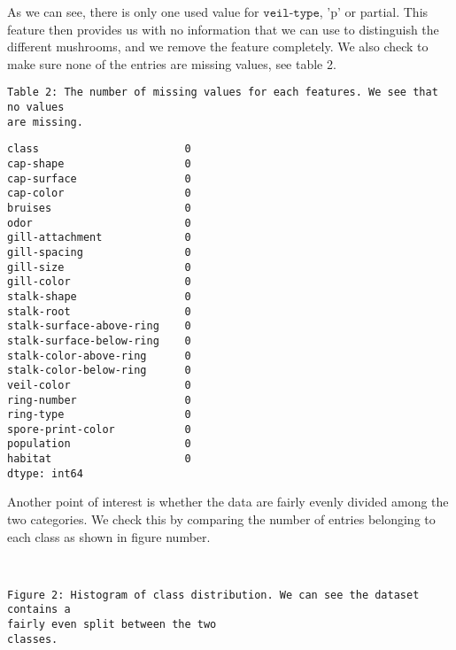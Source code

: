 \documentclass[11pt]{article}
\makeatletter
\newcommand{\boxspacing}{\kern\kvtcb@left@rule\kern\kvtcb@boxsep}
\newcommand{\prompt}[4]{
        {\ttfamily\llap{{\color{#2}[#3]:\hspace{3pt}#4}}\vspace{-\baselineskip}}
    }
\makeatother
\begin{document}
    As we can see, there is only one used value for $\texttt{veil-type}$, 'p' or
partial. This feature then provides us with no information that we can
use to distinguish the different mushrooms, and we remove the feature
completely. We also check to make sure none of the entries are missing
values, see table 2.

    \begin{Verbatim}[commandchars=\\\{\}]
Table 2: The number of missing values for each features. We see that no values
are missing.
    \end{Verbatim}

            \begin{tcolorbox}[breakable, size=fbox, boxrule=.5pt, pad at break*=1mm, opacityfill=0]
\prompt{Out}{outcolor}{90}{\boxspacing}
\begin{Verbatim}[commandchars=\\\{\}]
class                       0
cap-shape                   0
cap-surface                 0
cap-color                   0
bruises                     0
odor                        0
gill-attachment             0
gill-spacing                0
gill-size                   0
gill-color                  0
stalk-shape                 0
stalk-root                  0
stalk-surface-above-ring    0
stalk-surface-below-ring    0
stalk-color-above-ring      0
stalk-color-below-ring      0
veil-color                  0
ring-number                 0
ring-type                   0
spore-print-color           0
population                  0
habitat                     0
dtype: int64
\end{Verbatim}
\end{tcolorbox}
        
    Another point of interest is whether the data are fairly evenly divided
among the two categories. We check this by comparing the number of
entries belonging to each class as shown in figure number.


    \begin{center}
    \end{center}
    { \hspace*{\fill} \\}
    
    \begin{Verbatim}[commandchars=\\\{\}]
Figure 2: Histogram of class distribution. We can see the dataset contains a
fairly even split between the two
classes.
    \end{Verbatim}
\end{document}
